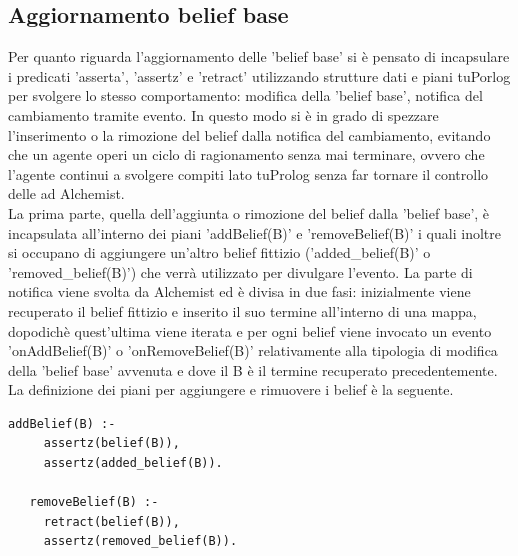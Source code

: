 \documentclass[12pt,a4paper,openright,twoside]{report}
\begin{document}
\subsection{Aggiornamento belief base}
Per quanto riguarda l'aggiornamento delle 'belief base' si \`e pensato di incapsulare i predicati 'asserta', 'assertz' e 'retract' utilizzando strutture dati e piani tuPorlog per svolgere lo stesso comportamento: modifica della 'belief base', notifica del cambiamento tramite evento. In questo modo si \`e in grado di spezzare l'inserimento o la rimozione del belief dalla notifica del cambiamento, evitando che un agente operi un ciclo di ragionamento senza mai terminare, ovvero che l'agente continui a svolgere compiti lato tuProlog senza far tornare il controllo delle ad Alchemist.
\\
La prima parte, quella dell'aggiunta o rimozione del belief dalla 'belief base', \`e incapsulata all'interno dei piani 'addBelief(B)' e 'removeBelief(B)' i quali inoltre si occupano di aggiungere un'altro belief fittizio ('added\_belief(B)' o 'removed\_belief(B)') che verr\`a utilizzato per divulgare l'evento.
La parte di notifica viene svolta da Alchemist ed \`e divisa in due fasi: inizialmente viene recuperato il belief fittizio e inserito il suo termine all'interno di una mappa, dopodich\`e quest'ultima viene iterata e per ogni belief viene invocato un evento 'onAddBelief(B)' o 'onRemoveBelief(B)' relativamente alla tipologia di modifica della 'belief base' avvenuta e dove il B \`e il termine recuperato precedentemente.
La definizione dei piani per aggiungere e rimuovere i belief \`e la seguente.
\medskip
{}
\begin{lstlisting}[firstnumber=1,caption={Implementazione piani per l'aggiunta e rimozione di belief}]
   addBelief(B) :-
     assertz(belief(B)),
     assertz(added_belief(B)).

   removeBelief(B) :-
     retract(belief(B)),
     assertz(removed_belief(B)).
\end{lstlisting}

\end{document}
